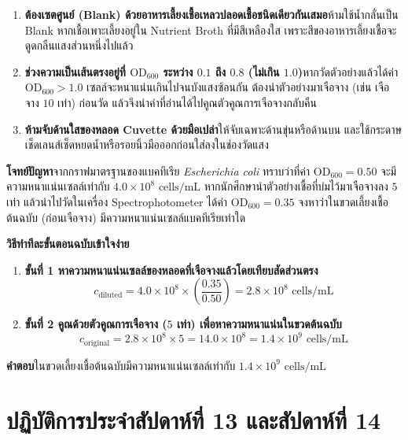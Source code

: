\begin{warningbox}
\begin{enumerate}
    \item \textbf{ต้องเซตศูนย์ (Blank) ด้วยอาหารเลี้ยงเชื้อเหลวปลอดเชื้อชนิดเดียวกันเสมอ}\quad ห้ามใช้น้ำกลั่นเป็น Blank หากเชื้อเพาะเลี้ยงอยู่ใน Nutrient Broth ที่มีสีเหลืองใส เพราะสีของอาหารเลี้ยงเชื้อจะดูดกลืนแสงส่วนหนึ่งไปแล้ว
    \item \textbf{ช่วงความเป็นเส้นตรงอยู่ที่ $\text{OD}_{600}$ ระหว่าง $0.1$ ถึง $0.8$ (ไม่เกิน $1.0$)}\quad หากวัดตัวอย่างแล้วได้ค่า $\text{OD}_{600} > 1.0$ เซลล์จะหนาแน่นเกินไปจนบังแสงซ้อนกัน ต้องนำตัวอย่างมาเจือจาง (เช่น เจือจาง $10$ เท่า) ก่อนวัด แล้วจึงนำค่าที่อ่านได้ไปคูณตัวคูณการเจือจางกลับคืน
    \item \textbf{ห้ามจับด้านใสของหลอด Cuvette ด้วยมือเปล่า}\quad ให้จับเฉพาะด้านขุ่นหรือด้านบน และใช้กระดาษเช็ดเลนส์เช็ดหยดน้ำหรือรอยนิ้วมือออกก่อนใส่ลงในช่องวัดแสง
\end{enumerate}
\end{warningbox}

\begin{worked}
\textbf{โจทย์ปัญหา}\quad จากกราฟมาตรฐานของแบคทีเรีย \textit{Escherichia coli} ทราบว่าที่ค่า $\text{OD}_{600} = 0.50$ จะมีความหนาแน่นเซลล์เท่ากับ $4.0 \times 10^8\text{ cells/mL}$ หากนักศึกษานำตัวอย่างเชื้อที่บ่มไว้มาเจือจางลง $5$ เท่า แล้วนำไปวัดในเครื่อง Spectrophotometer ได้ค่า $\text{OD}_{600} = 0.35$ จงหาว่าในขวดเลี้ยงเชื้อต้นฉบับ (ก่อนเจือจาง) มีความหนาแน่นเซลล์แบคทีเรียเท่าใด

\textbf{วิธีทำทีละขั้นตอนฉบับเข้าใจง่าย}
\begin{enumerate}
    \item \textbf{ขั้นที่ 1 หาความหนาแน่นเซลล์ของหลอดที่เจือจางแล้วโดยเทียบสัดส่วนตรง}
    \[
        c_{\text{diluted}} = 4.0 \times 10^8 \times \left(\frac{0.35}{0.50}\right) = 2.8 \times 10^8\text{ cells/mL}
    \]
    \item \textbf{ขั้นที่ 2 คูณด้วยตัวคูณการเจือจาง ($5$ เท่า) เพื่อหาความหนาแน่นในขวดต้นฉบับ}
    \[
        c_{\text{original}} = 2.8 \times 10^8 \times 5 = 14.0 \times 10^8 = 1.4 \times 10^9\text{ cells/mL}
    \]
\end{enumerate}
\textbf{คำตอบ}\quad ในขวดเลี้ยงเชื้อต้นฉบับมีความหนาแน่นเซลล์เท่ากับ $1.4 \times 10^9\text{ cells/mL}$
\end{worked}

\section{ปฏิบัติการประจำสัปดาห์ที่ 13 และสัปดาห์ที่ 14}

